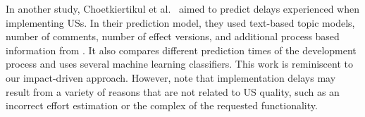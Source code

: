 In another study, Choetkiertikul et al.~\cite{choetkiertikul2017predicting} aimed to predict delays experienced when implementing USs. 
In their prediction model, they used text-based topic models, number of comments, number of effect versions, and additional process based information from \jira. It also compares different prediction times of the development process and uses several machine learning classifiers. 
This work is reminiscent to our impact-driven approach. However, note that implementation delays may result from a variety of reasons that are not related to US quality, such as an incorrect effort estimation or the complex of the requested functionality. 












